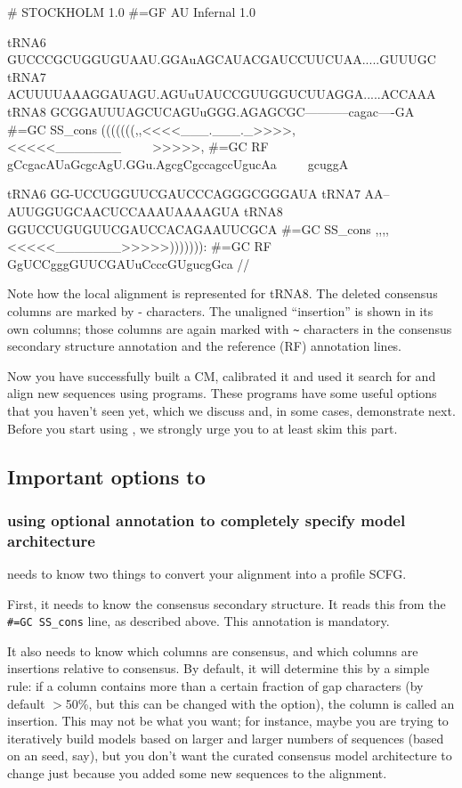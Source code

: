 {\samepage
\begin{sreoutput}
# STOCKHOLM 1.0
#=GF AU Infernal 1.0

tRNA6        GUCCCGCUGGUGUAAU.GGAuAGCAUACGAUCCUUCUAA.....GUUUGC
tRNA7        ACUUUUAAAGGAUAGU.AGUuUAUCCGUUGGUCUUAGGA.....ACCAAA
tRNA8        GCGGAUUUAGCUCAGUuGGG.AGAGCGC-----------cagac----GA
#=GC SS_cons (((((((,,<<<<___.___._>>>>,<<<<<_______~~~~~>>>>>,
#=GC RF      gCcgacAUaGcgcAgU.GGu.AgcgCgccagccUgucAa~~~~~gcuggA

tRNA6        GG-UCCUGGUUCGAUCCCAGGGCGGGAUA
tRNA7        AA--AUUGGUGCAACUCCAAAUAAAAGUA
tRNA8        GGUCCUGUGUUCGAUCCACAGAAUUCGCA
#=GC SS_cons ,,,,<<<<<_______>>>>>))))))):
#=GC RF      GgUCCgggGUUCGAUuCcccGUgucgGca
//
\end{sreoutput}
}

Note how the local alignment is represented for tRNA8. The deleted
consensus columns are marked by - characters. The unaligned
``insertion'' is shown in its own columns; those columns are again
marked with \verb+~+ characters in the consensus secondary structure
annotation and the reference (RF) annotation lines.

Now you have successfully built a CM, calibrated it and used it search
for and align new sequences using  programs.
These programs have some useful options that you haven't seen
yet, which we discuss and, in some cases, demonstrate next. Before you
start using , we strongly urge you to at
least skim this part. 

\subsection{Important options to }

\subsubsection{using optional annotation to completely specify model architecture}

 needs to know two things to convert your alignment into
a profile SCFG.

First, it needs to know the consensus secondary structure. It reads
this from the {\small\verb+#=GC SS_cons+} line, as described
above. This annotation is mandatory.

It also needs to know which columns are consensus, and which columns
are insertions relative to consensus. By default, it will determine
this by a simple rule: if a column contains more than a certain
fraction of gap characters (by default $>$50\%, but this can be changed
with the  option), the column is called an
insertion. This may not be what you want; for instance, maybe you are
trying to iteratively build models based on larger and larger numbers
of sequences (based on an  seed, say), but you don't
want the curated consensus model architecture to change just because
you added some new sequences to the alignment.

